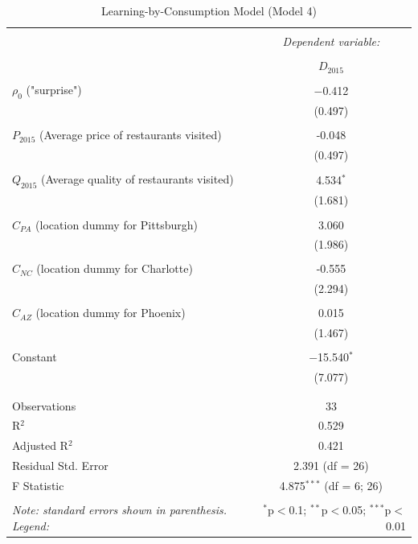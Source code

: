 \documentclass[Journal,letterpaper, NoLineNumbers]{ascelike-new}
\begin{document}
\begin{table}[!htbp] \centering 
  \caption{Learning-by-Consumption Model (Model 4)} 
  \label{} 
\begin{tabular}{@{\extracolsep{5pt}}lc} 
\\[-1.8ex]\hline 
\hline \\[-1.8ex] 
 & \multicolumn{1}{c}{\textit{Dependent variable:}} \\ 
\cline{2-2} 
\\[-1.8ex] & $D_{2015}$\\ 
\hline \\[-1.8ex] 
 $\rho_0$ ("surprise") & $-$0.412 \\ 
  & (0.497) \\ 
  & \\ 
 $P_{2015}$ (Average price of restaurants visited) & -0.048 \\ 
  & (0.497) \\ 
  & \\ 
 $Q_{2015}$ (Average quality of restaurants visited) & 4.534$^{*}$ \\ 
  & (1.681) \\ 
  & \\ 
 $C_{PA}$ (location dummy for Pittsburgh) & 3.060 \\ 
  & (1.986) \\ 
  & \\ 
 $C_{NC}$ (location dummy for Charlotte) & -0.555 \\ 
  & (2.294) \\ 
  & \\ 
 $C_{AZ}$ (location dummy for Phoenix) & 0.015 \\ 
  & (1.467) \\ 
  & \\ 
 Constant & $-$15.540$^{*}$ \\ 
  & (7.077) \\ 
  & \\ 
\hline \\[-1.8ex] 
Observations & 33 \\ 
R$^{2}$ & 0.529 \\ 
Adjusted R$^{2}$ & 0.421 \\ 
Residual Std. Error & 2.391 (df = 26) \\ 
F Statistic & 4.875$^{***}$ (df = 6; 26) \\ 
\hline 
\hline \\[-1.8ex] \textit{Note: standard errors shown in parenthesis. Legend: }  & \multicolumn{1}{r}{$^{*}$p$<$0.1; $^{**}$p$<$0.05; $^{***}$p$<$0.01} \\ 
\end{tabular} 
\end{table} 
\end{document}
